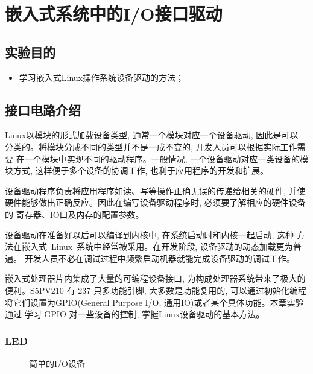\chapter{嵌入式系统中的I/O接口驱动}

\section{实验目的}
\begin{itemize}\itemsep=-3pt
  \item 学习嵌入式Linux操作系统设备驱动的方法；
\end{itemize}

\section{接口电路介绍}
	Linux以模块的形式加载设备类型, 通常一个模块对应一个设备驱动, 因此是可以
分类的。将模块分成不同的类型并不是一成不变的, 开发人员可以根据实际工作需要
在一个模块中实现不同的驱动程序。一般情况, 一个设备驱动对应一类设备的模块方式, 
这样便于多个设备的协调工作, 也利于应用程序的开发和扩展。

	设备驱动程序负责将应用程序如读、写等操作正确无误的传递给相关的硬件, 并使
硬件能够做出正确反应。因此在编写设备驱动程序时, 必须要了解相应的硬件设备的
寄存器、IO口及内存的配置参数。

	设备驱动在准备好以后可以编译到内核中, 在系统启动时和内核一起启动, 这种
方法在嵌入式~Linux~系统中经常被采用。在开发阶段, 设备驱动的动态加载更为普遍。
开发人员不必在调试过程中频繁启动机器就能完成设备驱动的调试工作。

	嵌入式处理器片内集成了大量的可编程设备接口, 为构成处理器系统带来了极大的
便利。S5PV210 有 237 只多功能引脚, 大多数是功能复用的, 可以通过初始化编程
将它们设置为GPIO(General Purpose I/O, 通用IO)或者某个具体功能。本章实验通过
学习 GPIO 对一些设备的控制, 掌握Linux设备驱动的基本方法。

\subsection{LED}
\begin{figure}
\centering
{}\hspace{5mm}
\caption{简单的I/O设备}\label{simple_IO}
\end{figure}

